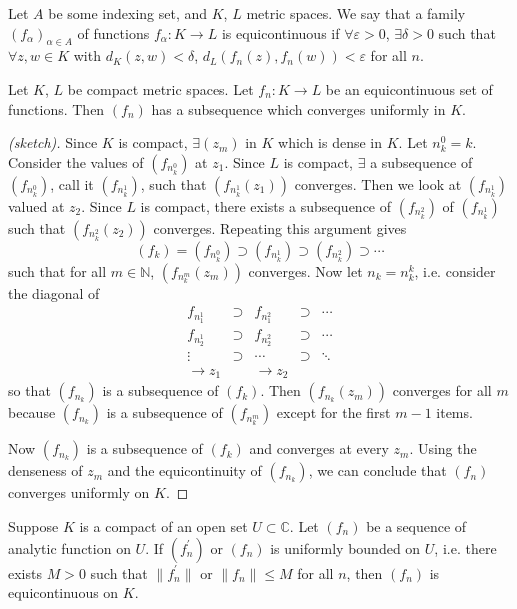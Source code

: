 \begin{defn}
Let $A$ be some indexing set, and $K$, $L$ metric spaces.
We say that a family $(f_\alpha)_{\alpha \in A}$
of functions $f_\alpha : K \to L$ is equicontinuous if
$\forall \varepsilon > 0$, $\exists \delta > 0$ such that
$\forall z, w \in K$ with $d_K(z, w) < \delta$,
$d_L(f_n(z), f_n(w)) < \varepsilon$ for all $n$.
\end{defn}

\begin{theorem}
Let $K$, $L$ be compact metric spaces. Let $f_n : K \to L$ be an
equicontinuous set of functions. Then $(f_n)$ has a subsequence which
converges uniformly in $K$.
\end{theorem}

\begin{proof}[(sketch)]
Since $K$ is compact, $\exists (z_m)$ in $K$ which is dense in $K$.
Let $n_k^0 = k$. Consider the values of $(f_{n_k^0})$ at $z_1$. Since
$L$ is compact, $\exists$ a subsequence of $(f_{n_k^0})$, call it
$(f_{n_k^1})$, such that $(f_{n_k^1}(z_1))$ converges. Then we look at
$(f_{n_k^1})$ valued at $z_2$. Since $L$ is compact, there exists a
subsequence of $(f_{n_k^2})$ of $(f_{n_k^1})$ such that
$(f_{n_k^2}(z_2))$ converges. Repeating this argument gives
$$
        (f_k)
=       (f_{n_k^0})
\supset (f_{n_k^1})
\supset (f_{n_k^2})
\supset \cdots
$$
such that for all $m \in \mathbb{N}$, $(f_{n_k^m}(z_m))$ converges.
Now let $n_k = n_k^k$, i.e. consider the diagonal of
\begin{align*}
  f_{n_1^1} & \supset & f_{n_1^2} & \supset & \cdots \\
  f_{n_2^1} & \supset & f_{n_2^2} & \supset & \cdots \\
  \vdots  & \supset & \cdots   & \supset & \ddots \\
  \to z_1 &         & \to z_2  &         &
\end{align*}
so that $(f_{n_k})$ is a subsequence of $(f_k)$. Then
$(f_{n_k}(z_m))$ converges for all $m$ because
$(f_{n_k})$ is a subsequence of $(f_{n_k^m})$ except for the first
$m-1$ items.

Now $(f_{n_k})$ is a subsequence of $(f_k)$ and converges at every
$z_m$. Using the denseness of $z_m$ and the equicontinuity of
$(f_{n_k})$, we can conclude that $(f_n)$ converges uniformly on $K$.
\end{proof}

\begin{lemma}
Suppose $K$ is a compact of an open set $U \subset\mathbb{C}$. Let
$(f_n)$ be a sequence of analytic function on $U$. If $(f_n^\prime)$
or $(f_n)$ is uniformly bounded on $U$, i.e. there exists $M > 0$
such that $\| f_n^\prime \|$ or $\| f_n \| \leq M$ for all $n$,
then $(f_n)$ is equicontinuous on $K$.
\end{lemma}

